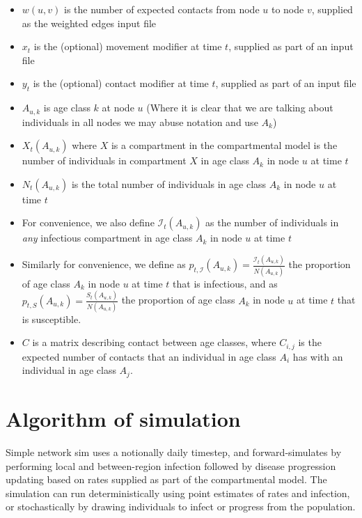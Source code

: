 \documentclass[11pt]{article}
\begin{document}
\begin{itemize}
\item $w(u, v)$ is the number of expected contacts from node $u$ to node $v$, supplied as the weighted edges input file
\item $x_t$ is the (optional) movement modifier at time $t$, supplied as part of an input file
\item $y_t$ is the (optional) contact modifier at time $t$, supplied as part of an input file
\item $A_{u,k}$ is age class $k$ at node $u$ (Where it is clear that we are talking about individuals in all nodes we may abuse notation and use $A_k$)
\item $X_t(A_{u,k})$ where $X$ is a compartment in the compartmental model is the number of individuals in compartment $X$ in age class $A_k$ in node $u$ at time $t$
\item $N_t(A_{u,k})$ is the total number of individuals in age class $A_k$ in node $u$ at time $t$
\item For convenience, we also define $\mathcal{I}_t(A_{u,k})$ as the number of individuals in \emph{any} infectious compartment in age class $A_k$ in node $u$ at time $t$
\item Similarly for convenience, we define as $p_{t, \mathcal{I}}(A_{u,k}) = \frac{\mathcal{I}_t(A_{u,k})}{N(A_{u,k})}$ the proportion of age class $A_k$ in node $u$ at time $t$ that is infectious, and as $p_{t, S}(A_{u,k}) = \frac{S_t(A_{u,k})}{N(A_{u,k})}$ the proportion of age class $A_k$ in node $u$ at time $t$ that is susceptible.
\item $C$ is a matrix describing contact between age classes, where $C_{i,j}$ is the expected number of contacts that an individual in age class $A_i$ has with an individual in age class $A_j$.
\end{itemize}


\section{Algorithm of simulation}

Simple network sim uses a notionally daily timestep, and forward-simulates by performing local and between-region infection followed by disease progression updating based on rates supplied as part of the compartmental model.  The simulation can run deterministically using point estimates of rates and infection, or stochastically by drawing individuals to infect or progress from the population.  
\end{document}
